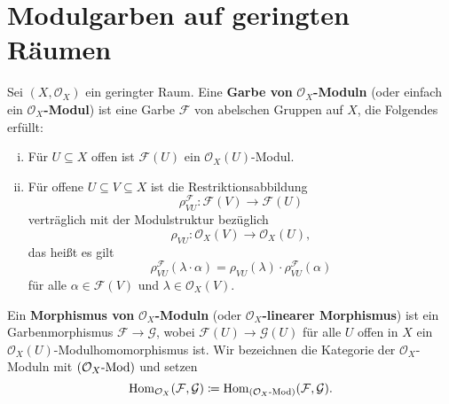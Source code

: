 
\chapter{Modulgarben auf geringten Räumen}

\begin{defn}
	Sei $(X,\mathcal{O}_X)$ ein geringter Raum. Eine \textbf{Garbe von} $\mathcal{O}_X$\textbf{-Moduln} (oder einfach ein $\mathcal{O}_X$\textbf{-Modul}) ist eine Garbe $\mathcal{F}$ von abelschen Gruppen auf $X$, die Folgendes erfüllt:
	\begin{enumerate}[i)]
		\item Für $U \subseteq X$ offen ist $\mathcal{F}(U)$ ein $\mathcal{O}_X(U)$-Modul.
		\item Für offene $U \subseteq V \subseteq X$ ist die Restriktionsabbildung
		\[
			\rho_{VU}^{\mathcal{F}}\colon \mathcal{F}(V) \to \mathcal{F}(U)
		\]
		verträglich mit der Modulstruktur bezüglich
		\[
			\rho_{VU}\colon \mathcal{O}_X(V) \to \mathcal{O}_X(U),
		\]
		das heißt es gilt
		\[
			\rho_{VU}^\mathcal{F}(\lambda \cdot \alpha) = \rho_{VU}(\lambda) \cdot \rho_{VU}^\mathcal{F}(\alpha)
		\]
		für alle $\alpha \in \mathcal{F}(V)$ und $\lambda \in \mathcal{O}_X(V)$.
	\end{enumerate}
	Ein \textbf{Morphismus von} $\mathcal{O}_X$\textbf{-Moduln} (oder $\mathcal{O}_X$\textbf{-linearer Morphismus}) ist ein Garbenmorphismus $\mathcal{F}\to \mathcal{G}$, wobei $\mathcal{F}(U) \to \mathcal{G}(U)$ für alle $U$ offen in $X$ ein $\mathcal{O}_X(U)$-Modulhomomorphismus ist. Wir bezeichnen die Kategorie  der $\mathcal{O}_X$-Moduln mit $(\mathcal{O}_X\text{-}{\operatorname{Mod}})$ und setzen
	\[
		\operatorname{Hom}_{\mathcal{O}_X}(\mathcal{F},\mathcal{G}) \coloneqq
                \operatorname{Hom}_{(\mathcal{O}_X\text{-}{\operatorname{Mod}})}(\mathcal{F},\mathcal{G}).
	\]
\end{defn}

